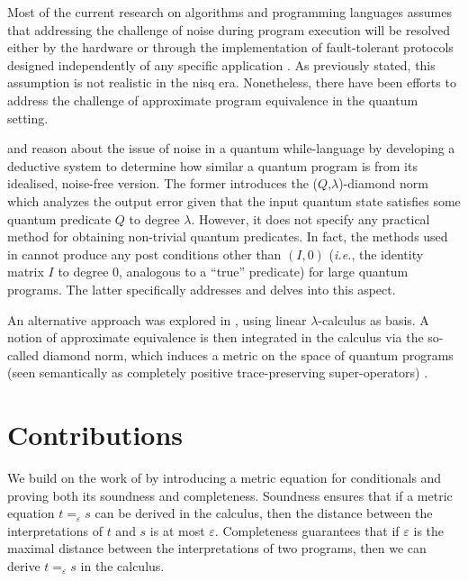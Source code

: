 Most of the current research on algorithms and programming languages assumes that addressing the challenge of noise during program execution will be resolved either by the hardware or through the implementation of fault-tolerant protocols designed independently of any specific application \cite{chong2017programming}. As previously stated, this assumption is not realistic in the \acrshort{nisq} era. Nonetheless, there have been efforts to address the challenge of approximate program equivalence in the quantum setting. 

\cite{hung2019quantitative} and \cite{tao2021gleipnir} reason about the issue of noise in a quantum while-language by developing a deductive system to determine how similar a quantum program is from its idealised, noise-free version. The former introduces the ($Q$,$\lambda$)-diamond norm which analyzes the output error given that the input quantum state satisfies some quantum predicate $Q$ to degree $\lambda$. However, it does not specify any practical method for obtaining non-trivial quantum predicates. In fact, the methods used in \cite{hung2019quantitative} cannot produce any post conditions other than $(I,0)$ (\textit{i.e.}, the identity matrix $I$ to degree 0, analogous to a ``true” predicate) for large quantum programs. The latter specifically addresses and delves into this aspect.  

An alternative approach was explored in \cite{dahlqvist2023syntactic}, using linear $\lambda$-calculus as basis. A notion of approximate equivalence is then
integrated in the calculus via the so-called diamond norm, which induces a metric on the space of quantum programs (seen semantically as completely positive trace-preserving super-operators) \cite{watrous2018theory}. 




\section{Contributions}
We build on the work of \cite{dahlqvist2023syntactic} by introducing a metric equation for conditionals and proving both its soundness and completeness. Soundness ensures that if a metric equation $t =_{\varepsilon} s$ can be derived in the calculus, then the distance between the interpretations of $t$ and $s$ is at most $\varepsilon$. Completeness guarantees that if $\varepsilon$ is the maximal distance between the interpretations of two programs, then we can derive $t =_{\varepsilon} s$ in the calculus. 

